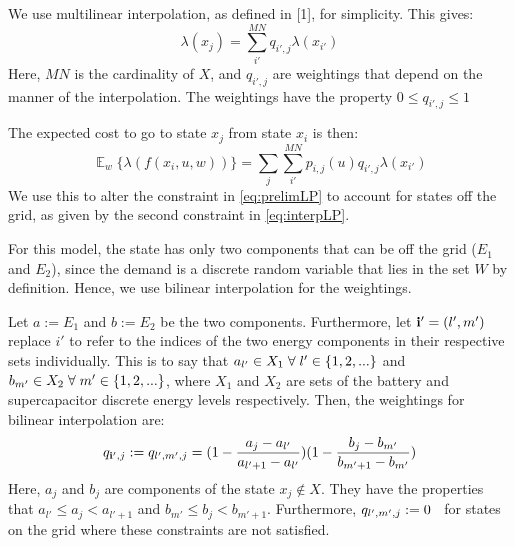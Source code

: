 \documentclass[conference]{IEEEtran}
\DeclareMathOperator{\E}{\mathbb{E}}
\begin{document}
We use multilinear interpolation, as defined in [1], for simplicity. This gives:
\begin{displaymath}
	\lambda(x_{j})=\sum_{i'}^{MN}q_{i',j}\lambda(x_{i'})
\end{displaymath} Here, $MN$ is the cardinality of $X$, and $q_{i',j}$ are weightings that depend on the manner of the interpolation. The weightings have the property $0\leq q_{i',j}\leq 1$

The expected cost to go to state $x_{j}$ from state $x_{i}$ is then:
\begin{displaymath}
    \mathop{\E}_{w}\{\lambda(f(x_{i},u,w))\}=\sum_{j}\sum_{i'}^{MN}p_{i,j}(u)q_{i',j}\lambda(x_{i'})
\end{displaymath} We use this to alter the constraint in \eqref{eq:prelimLP} to account for states off the grid, as given by the second constraint in \eqref{eq:interpLP}.

For this model, the state has only two components that can be off the grid ($E_{1}$ and $E_{2}$), since the demand is a discrete random variable that lies in the set $W$ by definition. Hence, we use bilinear interpolation for the weightings.

Let $a:=E_{1}$ and $b:=E_{2}$ be the two components. Furthermore, let $\bold{i'}=(l',m')$ replace $i'$ to refer to the indices of the two energy components in their respective sets individually. This is to say that $a_{l'}\in X_{1}\hspace{0.1cm}\forall\hspace{0.1cm}l'\in\{1,2,...\}$ and $b_{m'}\in X_{2}\hspace{0.1cm}\forall\hspace{0.1cm} m'\in\{1,2,...\}$, where $X_{1}$ and $X_{2}$ are sets of the battery and supercapacitor discrete energy levels respectively. %
Then, the weightings for bilinear interpolation are:
\begin{displaymath}
    q_{\bold{i'},j}:=q_{l',m',j}=(1-\frac{a_{j}-a_{l'}}{a_{l'+1}-a_{l'}})(1-\frac{b_{j}-b_{m'}}{b_{m'+1}-b_{m'}})
\end{displaymath} Here, $a_{j}$ and $b_{j}$ are components of the state $x_{j}\not\in X$. They have the properties that $a_{l'}\leq a_{j}< a_{l'+1}$ and $b_{m'}\leq b_{j}< b_{m'+1}$. Furthermore, $q_{l',m',j}:=0\hspace{0.2cm}$ for states on the grid where these constraints are not satisfied.

\end{document}
